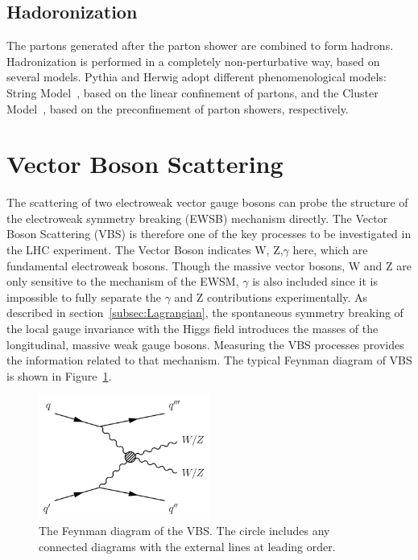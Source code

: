 \subsection{Hadoronization}
The partons generated after the parton shower are combined to form hadrons. 
Hadronization is performed in a completely non-perturbative way, based on several models. 
Pythia and Herwig adopt different phenomenological models: String Model~\cite{ANDERSSON198331}, based on the linear confinement of partons, and the Cluster Model~\cite{MARCHESINI19841}, based on the preconfinement of parton showers, respectively.

\section{Vector Boson Scattering}
\label{sec:VBS}
The scattering of two electroweak vector gauge bosons can probe the structure of the electroweak symmetry breaking (EWSB) mechanism directly. 
The Vector Boson Scattering (VBS) is therefore one of the key processes to be investigated in the LHC experiment.
The Vector Boson indicates W, Z,$\gamma$ here, which are fundamental electroweak bosons. 
Though the massive vector bosons, W and Z are only sensitive to the mechanism of the EWSM, $\gamma$ is also included since it is impossible to fully separate the $\gamma$ and Z contributions experimentally. 
As described in section~\ref{subsec:Lagrangian}, the spontaneous symmetry breaking of the local gauge invariance with the Higgs field
introduces the masses of the longitudinal, massive weak gauge bosons. 
Measuring the VBS processes provides the information related to that mechanism.
The typical Feynman diagram of VBS is shown in Figure~\ref{fig:VBS}.

\begin{figure}[tbp]
\begin{center}
 \includegraphics[width=0.50\textwidth,keepaspectratio]{figures/VBS}
\caption{
The Feynman diagram of the VBS. The circle includes any connected diagrams with the external lines at leading order.%
}
\label{fig:VBS}
\end{center}
\end{figure}


